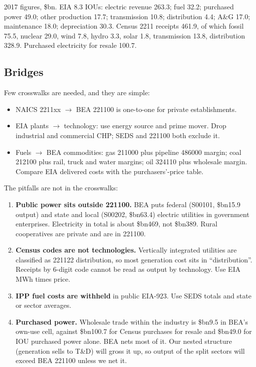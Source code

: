 \documentclass[11pt]{article}
\newcommand{\bn}{\$bn}
\begin{document}
2017 figures, \bn. EIA 8.3 IOUs: electric revenue 263.3; fuel 32.2; purchased power 49.0; other production 17.7; transmission 10.8; distribution 4.4; A\&G 17.0; maintenance 18.0; depreciation 30.3. Census 2211 receipts 461.9, of which fossil 75.5, nuclear 29.0, wind 7.8, hydro 3.3, solar 1.8, transmission 13.8, distribution 328.9. Purchased electricity for resale 100.7.

\subsection{Bridges}
Few crosswalks are needed, and they are simple:
\begin{itemize}
  \item NAICS 2211xx $\to$ BEA 221100 is one-to-one for private establishments.
  \item EIA plants $\to$ technology: use energy source and prime mover. Drop industrial and commercial CHP; SEDS and 221100 both exclude it.
  \item Fuels $\to$ BEA commodities: gas 211000 plus pipeline 486000 margin; coal 212100 plus rail, truck and water margins; oil 324110 plus wholesale margin. Compare EIA delivered costs with the purchasers'-price table.
\end{itemize}
The pitfalls are not in the crosswalks:
\begin{enumerate}
  \item \textbf{Public power sits outside 221100.} BEA puts federal (S00101, \bn15.9 output) and state and local (S00202, \bn63.4) electric utilities in government enterprises. Electricity in total is about \bn469, not \bn389. Rural cooperatives are private and are in 221100.
  \item \textbf{Census codes are not technologies.} Vertically integrated utilities are classified as 221122 distribution, so most generation cost sits in ``distribution''. Receipts by 6-digit code cannot be read as output by technology. Use EIA MWh times price.
  \item \textbf{IPP fuel costs are withheld} in public EIA-923. Use SEDS totals and state or sector averages.
  \item \textbf{Purchased power.} Wholesale trade within the industry is \bn9.5 in BEA's own-use cell, against \bn100.7 for Census purchases for resale and \bn49.0 for IOU purchased power alone. BEA nets most of it. Our nested structure (generation sells to T\&D) will gross it up, so output of the split sectors will exceed BEA 221100 unless we net it.
\end{enumerate}
\end{document}
